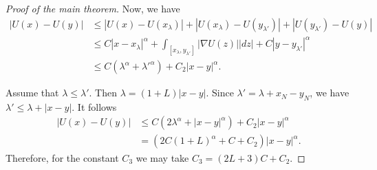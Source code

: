 \documentclass[10pt]{amsart}
\theoremstyle{definition}
\numberwithin{equation}{section}
\begin{document}
\begin{proof}[Proof of the main theorem]
Now, we have
\begin{equation*}\begin{split}
|U(x) - U (y)| & \le |U(x) - U (x_\lambda)| + |U(x_\lambda) - U (y_{\lambda'})| + |U(y_ {\lambda '}) - U (y)|
\\& \le C |x - x_\lambda |^\alpha  + \int _ {[x_\lambda,y_{\lambda'}]} |\nabla  U( z )| |dz|
+ C|y-y_{\lambda'}|^\alpha
\\&  \le  C (\lambda^\alpha  + {\lambda' }^\alpha ) +C_2 |x-y|^\alpha.
\end{split}\end{equation*}

Assume that $\lambda\le \lambda'$. Then $\lambda = (1+L) |x-y|$.     Since $\lambda '= \lambda  +  x_ N - y_N$, we  have
$\lambda ' \le \lambda +|x-y| $. It  follows
\begin{equation*}\begin{split}
|U(x) - U (y)| & \le   C (2\lambda^\alpha  + |x-y|^\alpha ) +C_2 |x-y|^\alpha
\\&=  (2 C (1+L)^\alpha  +  C + C_2 ) |x-y|^\alpha.
\end{split}\end{equation*}
Therefore, for the constant   $C_3$   we may take  $C_3 =  (2L+3)C + C_2 $.
\end{proof}
\end{document}
